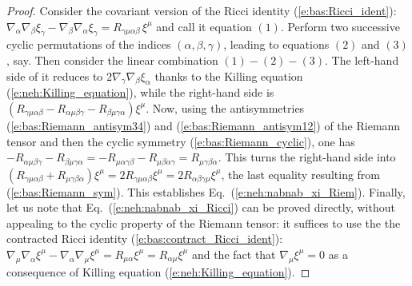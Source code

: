 \begin{proof}
Consider
the covariant version of the Ricci identity (\ref{e:bas:Ricci_ident}):
$\nabla_\alpha\nabla_\beta \xi_\gamma - \nabla_\beta\nabla_\alpha \xi_\gamma
        = R_{\gamma\mu \alpha\beta} \, \xi^\mu$ and call it equation $(1)$.
Perform two successive cyclic permutations of the indices $(\alpha,\beta,\gamma)$, leading
to equations $(2)$ and $(3)$, say. Then consider the linear combination $(1) - (2) - (3)$.
The left-hand side of it reduces to $2 \nabla_\gamma \nabla_\beta \xi_\alpha$
thanks to the Killing equation (\ref{e:neh:Killing_equation}), while the
right-hand side is $(R_{\gamma\mu \alpha\beta} - R_{\alpha\mu\beta\gamma} - R_{\beta\mu\gamma\alpha})\xi^\mu$.
Now, using the antisymmetries (\ref{e:bas:Riemann_antisym34}) and (\ref{e:bas:Riemann_antisym12}) of the Riemann tensor and then the cyclic symmetry (\ref{e:bas:Riemann_cyclic}), one has
$- R_{\alpha\mu\beta\gamma} - R_{\beta\mu\gamma\alpha} = - R_{\mu\alpha\gamma\beta} - R_{\mu\beta\alpha\gamma}
= R_{\mu\gamma\beta\alpha}$. This turns the right-hand side into $(R_{\gamma\mu \alpha\beta} + R_{\mu\gamma\beta\alpha})\xi^\mu = 2 R_{\gamma\mu \alpha\beta} \xi^\mu = 2 R_{\alpha\beta\gamma\mu} \xi^\mu$, the last equality resulting from
(\ref{e:bas:Riemann_sym}). This establishes Eq.~(\ref{e:neh:nabnab_xi_Riem}).
Finally, let us note that Eq.~(\ref{e:neh:nabnab_xi_Ricci}) can be proved directly, without appealing
to the cyclic property of the Riemann tensor: it suffices to use the the contracted Ricci identity (\ref{e:bas:contract_Ricci_ident}):  $\nabla_\mu \nabla_\alpha \xi^\mu - \nabla_\alpha \nabla_\mu \xi^\mu = R_{\mu\alpha} \xi^\mu = R_{\alpha\mu} \xi^\mu$ and the fact that $\nabla_\mu \xi^\mu = 0$ as a consequence
of Killing equation (\ref{e:neh:Killing_equation}).
\end{proof}


